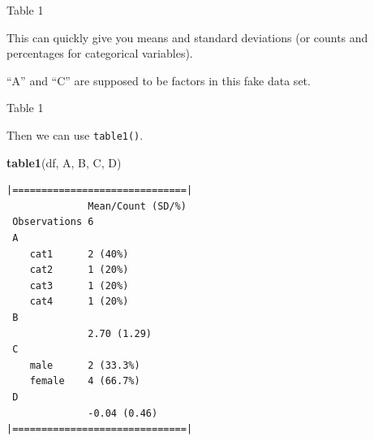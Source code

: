 \documentclass[10pt,ignorenonframetext,]{beamer}
\newenvironment{Shaded}{\begin{snugshade}}{\end{snugshade}}
\newcommand{\KeywordTok}[1]{\textcolor[rgb]{0.13,0.29,0.53}{\textbf{{#1}}}}
\newcommand{\DataTypeTok}[1]{\textcolor[rgb]{0.13,0.29,0.53}{{#1}}}
\newcommand{\StringTok}[1]{\textcolor[rgb]{0.31,0.60,0.02}{{#1}}}
\newcommand{\NormalTok}[1]{{#1}}
\begin{document}
\begin{frame}[fragile]{Table 1}

This can quickly give you means and standard deviations (or counts and
percentages for categorical variables).

``A'' and ``C'' are supposed to be factors in this fake data set.

\begin{Shaded}
\end{Shaded}

\end{frame}

\begin{frame}[fragile]{Table 1}

Then we can use \texttt{table1()}.

\begin{Shaded}
\begin{Highlighting}[]
\KeywordTok{table1}\NormalTok{(df, A, B, C, D)}
\end{Highlighting}
\end{Shaded}

\tiny
\begin{verbatim}
|==============================|
              Mean/Count (SD/%)
 Observations 6                
 A                             
    cat1      2 (40%)          
    cat2      1 (20%)          
    cat3      1 (20%)          
    cat4      1 (20%)          
 B                             
              2.70 (1.29)      
 C                             
    male      2 (33.3%)        
    female    4 (66.7%)        
 D                             
              -0.04 (0.46)     
|==============================|
\end{verbatim}

\end{frame}
\end{document}
